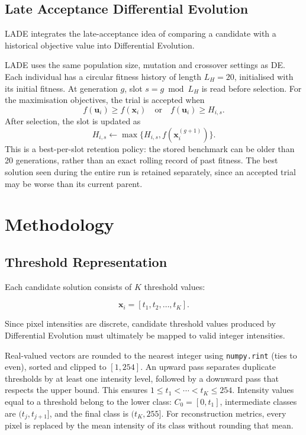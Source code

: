 \documentclass[review,authoryear]{elsarticle}
\begin{document}
\subsection{Late Acceptance Differential Evolution}

LADE integrates the late-acceptance idea of comparing a candidate with a
historical objective value \citep{burke2017late} into Differential Evolution.

LADE uses the same population size, mutation and crossover settings as DE.
Each individual has a circular fitness history of length $L_H=20$,
initialised with its initial fitness. At generation $g$, slot
$s=g\bmod L_H$ is read before selection. For the maximisation objectives,
the trial is accepted when
\begin{equation}
f(\mathbf{u}_i)\geq f(\mathbf{x}_i)
\quad\text{or}\quad f(\mathbf{u}_i)\geq H_{i,s}.
\end{equation}
After selection, the slot is updated as
\begin{equation}
H_{i,s}\leftarrow\max\{H_{i,s},f(\mathbf{x}_i^{(g+1)})\}.
\end{equation}
This is a best-per-slot retention policy: the stored benchmark can be
older than 20 generations, rather than an exact rolling record of past
fitness. The best solution seen during the entire run is retained
separately, since an accepted trial may be worse than its current parent.





\section{Methodology}
\label{sec:methodology}


\subsection{Threshold Representation}

Each candidate solution consists of $K$ threshold values:

\begin{equation}
\mathbf{x}_i =
[t_1,t_2,\ldots,t_K].
\end{equation}

Since pixel intensities are discrete, candidate threshold values produced
by Differential Evolution must ultimately be mapped to valid integer
intensities.

Real-valued vectors are rounded to the nearest integer using
\texttt{numpy.rint} (ties to even), sorted and clipped to $[1,254]$.
An upward pass separates duplicate thresholds by at least one intensity
level, followed by a downward pass that respects the upper bound.
This ensures $1\leq t_1<\cdots<t_K\leq254$. Intensity values equal to a
threshold belong to the lower class: $C_0=[0,t_1]$, intermediate classes
are $(t_j,t_{j+1}]$, and the final class is $(t_K,255]$.
For reconstruction metrics, every pixel is replaced by the mean intensity
of its class without rounding that mean.
\end{document}
